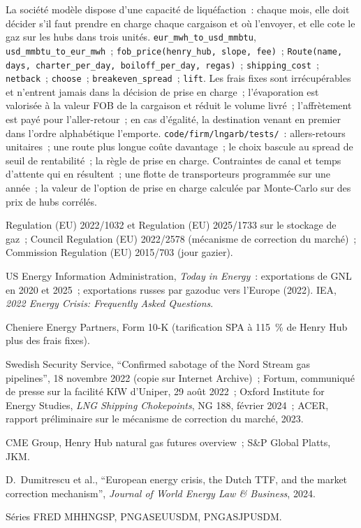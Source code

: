 \begin{build}
 La société modèle dispose d'une capacité de liquéfaction~: chaque mois, elle doit
décider s'il faut prendre en charge chaque cargaison et où l'envoyer, et elle cote le gaz sur les hubs dans
trois unités.
 \texttt{eur\_mwh\_to\_usd\_mmbtu}, \texttt{usd\_mmbtu\_to\_eur\_mwh}~;
\texttt{fob\_price(henry\_hub, slope, fee)}~; \texttt{Route(name, days, charter\_per\_day,
boiloff\_per\_day, regas)}~; \texttt{shipping\_cost}~; \texttt{netback}~; \texttt{choose}~;
\texttt{breakeven\_spread}~; \texttt{lift}.
 Les frais fixes sont irrécupérables et n'entrent jamais dans la décision de prise en charge~; l'évaporation
est valorisée à la valeur FOB de la cargaison et réduit le volume livré~; l'affrètement est payé pour l'aller-retour~; en cas
d'égalité, la destination venant en premier dans l'ordre alphabétique l'emporte.
 \texttt{code/firm/lngarb/tests/}~: allers-retours unitaires~; une route plus longue
coûte davantage~; le choix bascule au spread de seuil de rentabilité~; la règle de prise en charge.
 Contraintes de canal et temps d'attente qui en résultent~; une flotte de transporteurs
programmée sur une année~; la valeur de l'option de prise en charge calculée par Monte-Carlo sur des prix de hubs
corrélés.
\end{build}

\begin{omsources}
\item Regulation (EU) 2022/1032 et Regulation (EU) 2025/1733 sur le stockage de gaz~; Council
Regulation (EU) 2022/2578 (mécanisme de correction du marché)~; Commission Regulation (EU)
2015/703 (jour gazier).
\item US Energy Information Administration, \emph{Today in Energy}~: exportations de GNL en 2020 et
2025~; exportations russes par gazoduc vers l'Europe (2022). IEA, \emph{2022 Energy Crisis: Frequently
Asked Questions}.
\item Cheniere Energy Partners, Form 10-K (tarification SPA à 115~\% de Henry Hub plus des
frais fixes).
\item Swedish Security Service, ``Confirmed sabotage of the Nord Stream gas pipelines'', 18 novembre 2022 (copie
sur Internet Archive)~; Fortum, communiqué de presse sur la facilité KfW d'Uniper, 29 août 2022~; Oxford Institute for Energy Studies, \emph{LNG
Shipping Chokepoints}, NG 188, février 2024~; ACER, rapport préliminaire sur le
mécanisme de correction du marché, 2023.
\item CME Group, Henry Hub natural gas futures overview~; S\&P Global Platts, JKM.
\item D.~Dumitrescu et al.,
``European energy crisis, the Dutch TTF, and the market correction mechanism'', \emph{Journal of World Energy Law \& Business}, 2024.
\item Séries FRED MHHNGSP, PNGASEUUSDM, PNGASJPUSDM.
\end{omsources}

